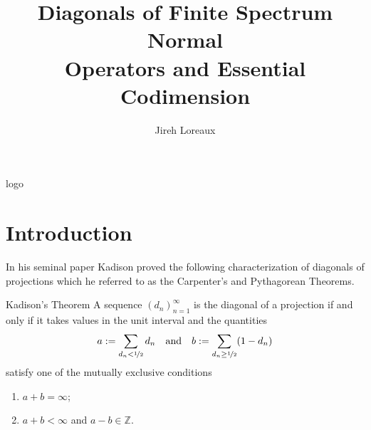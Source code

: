 \documentclass{article}
\begin{document}

\setmainfont{Linux Libertine}
\setsansfont{DejaVu Sans}
\LARGE\sffamily
{}


\title{Diagonals of Finite Spectrum Normal \\ Operators and Essential Codimension}
\author{Jireh Loreaux}
\maketitle


\begin{staticcontents*}{logo}
\end{staticcontents*}


\section*{Introduction}

In his seminal paper Kadison proved the following characterization of diagonals of projections which he referred to as the Carpenter's and Pythagorean Theorems.

\begin{thmcustom}{Kadison's Theorem}
  A sequence $(d_n)_{n=1}^{\infty}$ is the diagonal of a projection if and only if it takes values in the unit interval and the quantities
  \begin{equation*}
    a := \sum_{d_n < \nicefrac{1}{2}} d_n \quad\text{and}\quad b := \sum_{d_n \ge \nicefrac{1}{2}} (1-d_n)
  \end{equation*}
  satisfy one of the mutually exclusive conditions
  \begin{enumerate}
  \item $a+b = \infty$;
  \item $a+b < \infty$ and $a-b \in \mathbb{Z}$.
  \end{enumerate}
\end{thmcustom}
\end{document}

